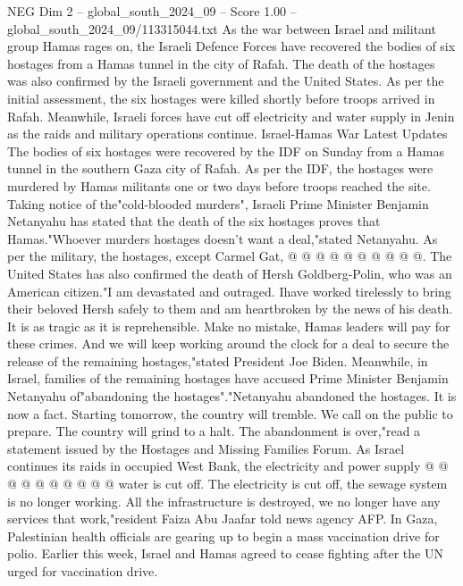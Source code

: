 \begin{textsample}{NEG Dim 2 – global\_south\_2024\_09 – Score 1.00 – global\_south\_2024\_09/113315044.txt}  \label{ex:f2_neg_407}
As the war between Israel and militant group Hamas rages on, the Israeli Defence Forces have recovered the bodies of six hostages from a Hamas tunnel in the city of Rafah.
The death of the hostages was also confirmed by the Israeli government and the United States.
As per the initial assessment, the six hostages were killed shortly before troops arrived in Rafah.
Meanwhile, Israeli forces have cut off electricity and water supply in Jenin as the raids and military operations continue.
Israel-Hamas War Latest Updates The bodies of six hostages were recovered by the IDF on Sunday from a Hamas tunnel in the southern Gaza city of Rafah.
As per the IDF, the hostages were murdered by Hamas militants one or two days before troops reached the site.
Taking notice of the"cold-blooded murders", Israeli Prime Minister Benjamin Netanyahu has stated that the death of the six hostages proves that Hamas."Whoever murders hostages doesn't want a deal,"stated Netanyahu.
As per the military, the hostages, except Carmel Gat, @ @ @ @ @ @ @ @ @ @.
The United States has also confirmed the death of Hersh Goldberg-Polin, who was an American citizen."I am devastated and outraged.
Ihave worked tirelessly to bring their beloved Hersh safely to them and am heartbroken by the news of his death.
It is as tragic as it is reprehensible.
Make no mistake, Hamas leaders will pay for these crimes.
And we will keep working around the clock for a deal to secure the release of the remaining hostages,"stated President Joe Biden.
Meanwhile, in Israel, families of the remaining hostages have accused Prime Minister Benjamin Netanyahu of"abandoning the hostages"."Netanyahu abandoned the hostages.
It is now a fact.
Starting tomorrow, the country will tremble.
We call on the public to prepare.
The country will grind to a halt.
The abandonment is over,"read a statement issued by the Hostages and Missing Families Forum.
As Israel continues its raids in occupied West Bank, the electricity and power supply @ @ @ @ @ @ @ @ @ @ water is cut off.
The electricity is cut off, the sewage system is no longer working.
All the infrastructure is destroyed, we no longer have any services that work,"resident Faiza Abu Jaafar told news agency AFP.
In Gaza, Palestinian health officials are gearing up to begin a mass vaccination drive for polio.
Earlier this week, Israel and Hamas agreed to cease fighting after the UN urged for vaccination drive.

\end{textsample}
